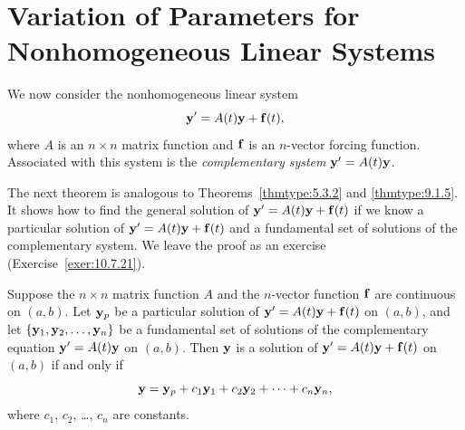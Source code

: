 \section{Variation of Parameters for Nonhomogeneous Linear Systems}

\noindent
We now consider the nonhomogeneous linear system
\[
  {\bf y}'=A(t){\bf y}+{\bf f}(t),
\]
where $A$ is an $n\times n$ matrix function and ${\bf f}$ is an $n$-vector forcing function.
Associated with this system is the {\color{blue}\it complementary system\/} ${\bf y}'=A(t){\bf y}$.

The next theorem is analogous to Theorems~\ref{thmtype:5.3.2} and \ref{thmtype:9.1.5}. It shows how
to find the general solution of ${\bf y}'=A(t){\bf y}+{\bf f}(t)$ if we know a particular solution
of ${\bf y}'=A(t){\bf y}+{\bf f}(t)$ and a fundamental set of solutions of the complementary system.
We leave the proof as an exercise (Exercise~\ref{exer:10.7.21}).

\begin{theorem}
  \color{blue}
  \label{thmtype:10.7.1} Suppose the $n\times n$ matrix function $A$ and the $n$-vector function
  ${\bf f}$ are continuous on $(a,b)$. Let ${\bf y}_{p}$ be a particular solution of
  ${\bf y}'=A(t){\bf y}+{\bf f}(t)$ on $(a,b)$, and let
  $\{{\bf y}_{1},{\bf y}_{2},\dots,{\bf y}_{n}\}$ be a fundamental set of solutions of the
  complementary equation ${\bf y}'=A(t){\bf y}$ on $(a,b)$. Then ${\bf y}$ is a solution of
  ${\bf y}'=A(t){\bf y}+{\bf f}(t)$ on $(a,b)$ if and only if
  \[
    {\bf y}={\bf y}_{p}+c_{1}{\bf y}_{1}+c_{2}{\bf y}_{2}+\cdots+c_{n}{\bf y}_{n},
  \]
  where $c_{1}$, $c_{2}$, \dots, $c_{n}$ are constants.
\end{theorem}


